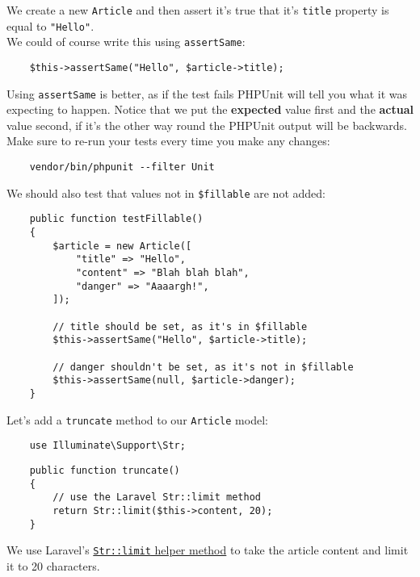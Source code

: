 We create a new \texttt{Article} and then assert it's true that it's \texttt{title} property is equal to \texttt{"Hello"}.
\\

We could of course write this using \texttt{assertSame}:

\begin{verbatim}
    $this->assertSame("Hello", $article->title);
\end{verbatim}

Using \texttt{assertSame} is better, as if the test fails PHPUnit will tell you what it was expecting to happen. Notice that we put the \textbf{expected} value first and the \textbf{actual} value second, if it's the other way round the PHPUnit output will be backwards.
\\

Make sure to re-run your tests every time you make any changes:

\begin{verbatim}
    vendor/bin/phpunit --filter Unit
\end{verbatim}

We should also test that values not in \texttt{\$fillable} are not added:

\begin{verbatim}
    public function testFillable()
    {
        $article = new Article([
            "title" => "Hello",
            "content" => "Blah blah blah",
            "danger" => "Aaaargh!",
        ]);

        // title should be set, as it's in $fillable
        $this->assertSame("Hello", $article->title);

        // danger shouldn't be set, as it's not in $fillable
        $this->assertSame(null, $article->danger);
    }
\end{verbatim}

Let's add a \texttt{truncate} method to our \texttt{Article} model:

\begin{verbatim}
    use Illuminate\Support\Str;
\end{verbatim}

\begin{verbatim}
    public function truncate()
    {
        // use the Laravel Str::limit method
        return Str::limit($this->content, 20);
    }
\end{verbatim}

We use Laravel's \href{http://laravel.com/docs/6.x/helpers#method-str-limit}{\texttt{Str::limit} helper method} to take the article content and limit it to 20 characters.
\\


